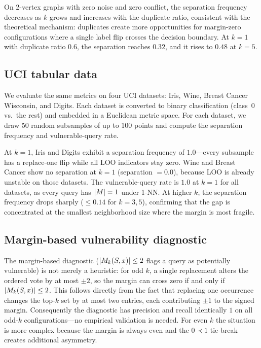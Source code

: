 On 2-vertex graphs with zero noise and zero conflict, the separation frequency
decreases as $k$ grows and increases with the duplicate ratio, consistent with
the theoretical mechanism: duplicates create more opportunities for
margin-zero configurations where a single label flip crosses the decision
boundary.  At $k=1$ with duplicate ratio $0.6$, the separation reaches $0.32$,
and it rises to $0.48$ at $k=5$.

\subsection{UCI tabular data}

We evaluate the same metrics on four UCI datasets: Iris, Wine, Breast Cancer
Wisconsin, and Digits.  Each dataset is converted to binary classification
(class~0 vs.\ the rest) and embedded in a Euclidean metric space.  For each
dataset, we draw 50 random subsamples of up to 100 points and compute the
separation frequency and vulnerable-query rate.

At $k=1$, Iris and Digits exhibit a separation frequency of $1.0$---every
subsample has a replace-one flip while all LOO indicators stay zero.  Wine and
Breast Cancer show no separation at $k=1$ (separation $=0.0$), because LOO is
already unstable on those datasets.  The vulnerable-query rate is $1.0$ at
$k=1$ for all datasets, as every query has $|M|=1$ under 1-NN.  At higher
$k$, the separation frequency drops sharply ($\le 0.14$ for $k=3,5$),
confirming that the gap is concentrated at the smallest neighborhood size
where the margin is most fragile.

\subsection{Margin-based vulnerability diagnostic}

The margin-based diagnostic ($|M_k(S,x)| \le 2$ flags a query as potentially
vulnerable) is not merely a heuristic: for odd $k$, a single replacement
alters the ordered vote by at most $\pm 2$, so the margin can cross zero if and
only if $|M_k(S,x)| \le 2$.  This follows directly from the fact that
replacing one occurrence changes the top-$k$ set by at most two entries, each
contributing $\pm 1$ to the signed margin.  Consequently the diagnostic has
precision and recall identically $1$ on all odd-$k$ configurations---no
empirical validation is needed.  For even $k$ the situation is more complex
because the margin is always even and the $0 \prec 1$ tie-break creates
additional asymmetry.

